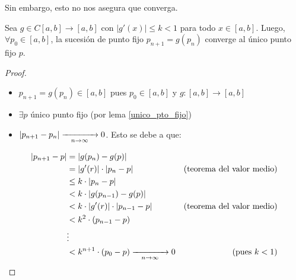 \documentclass[]{article}
\begin{document}
Sin embargo, esto no nos asegura que converga.

\begin{prop}
	Sea $g\in C[a,b]\to[a,b]$ con $|g'(x)| \leq k < 1$ para todo $x\in[a,b]$. Luego, $\forall p_0\in[a,b]$, la sucesión de punto fijo $p_{n+1} = g(p_n)$ converge al único punto fijo $p$.
	\begin{proof}
		\begin{itemize}
			\item $p_{n+1} = g(p_n) \in [a,b]$ pues $p_0 \in [a,b]$ y $g:[a,b]\to[a,b]$
			\item $\exists p$ único punto fijo (por lema \ref{unico_pto_fijo})
			\item $|p_{n+1}-p_n| \xrightarrow[\hspace*{0.3cm} n\to\infty \hspace*{0.3cm}]{} 0$. Esto se debe a que:
		\end{itemize}
		\begin{align*}
			|p_{n+1} - p| &= |g(p_n) - g(p)| \\
			&= |g'(r)|\cdot |p_n-p| & \text{(teorema del valor medio)}\\
			&\leq k \cdot |p_n-p|\\
			&< k\cdot |g(p_{n-1}) - g(p)|\\
			&< k\cdot |g'(r)|\cdot |p_{n-1}-p| &\text{(teorema del valor medio)}\\
			&< k^2\cdot (p_{n-1}-p)\\
			&\vdots\\
			&<k^{n+1}\cdot(p_0-p) \xrightarrow[\hspace*{0.3cm} n\to\infty \hspace*{0.3cm}]{} 0 & \text{(pues $k<1$)}
		\end{align*}
	\end{proof}
\end{prop}
\end{document}
